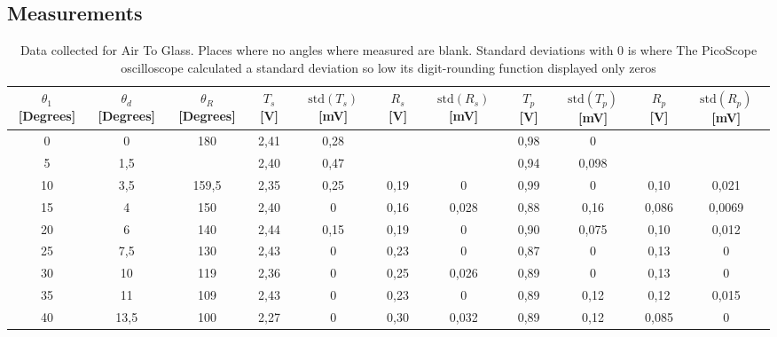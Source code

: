 \onecolumn
\begin{landscape}

\chapter{Measurements}
        \begin{table}[!ht]
            \caption{Data collected for Air To Glass. Places where no angles where measured are blank. Standard deviations with $0$ is where The PicoScope oscilloscope calculated a standard deviation so low its digit-rounding function displayed only zeros}
            \centering
            \begin{tabular}{ccccccccccc}
                \hline\hline
                $\theta_1$ [\textup{Degrees}] & $\theta_d$ [\textup{Degrees}] & $\theta_R$ [\textup{Degrees}]& $T_s$ [\textup{V}] & $\mathrm{std}(T_s)$ [\textup{mV}] & $R_s$ [\textup{V}] & $\mathrm{std}(R_s)$ [\textup{mV}] & $T_p$ [\textup{V}] & $\mathrm{std}(T_p)$ [\textup{mV}] & $R_p$ [\textup{V}] & $\mathrm{std}(R_p)$ [\textup{mV}]\\    
                \hline
                0        & 0        & 180      & 2,41  & 0,28    &        &           & 0,98  & 0       &       &           \\
                5        & 1,5      &          & 2,40  & 0,47    &        &           & 0,94  & 0,098   &       &           \\
                10       & 3,5      & 159,5    & 2,35  & 0,25    & 0,19   & 0         & 0,99  & 0       & 0,10  & 0,021    \\
                15       & 4        & 150      & 2,40  & 0       & 0,16   & 0,028     & 0,88  & 0,16    & 0,086 & 0,0069  \\
                20       & 6        & 140      & 2,44  & 0,15    & 0,19   & 0         & 0,90  & 0,075   & 0,10  & 0,012   \\
                25       & 7,5      & 130      & 2,43  & 0       & 0,23   & 0         & 0,87  & 0       & 0,13  & 0         \\
                30       & 10       & 119      & 2,36  & 0       & 0,25   & 0,026     & 0,89  & 0       & 0,13  & 0         \\
                35       & 11       & 109      & 2,43  & 0       & 0,23   & 0         & 0,89  & 0,12    & 0,12  & 0,015   \\
                40       & 13,5     & 100      & 2,27  & 0       & 0,30   & 0,032     & 0,89  & 0,12    & 0,085 & 0         \\

\end{tabular}
\end{table}
\end{landscape}
